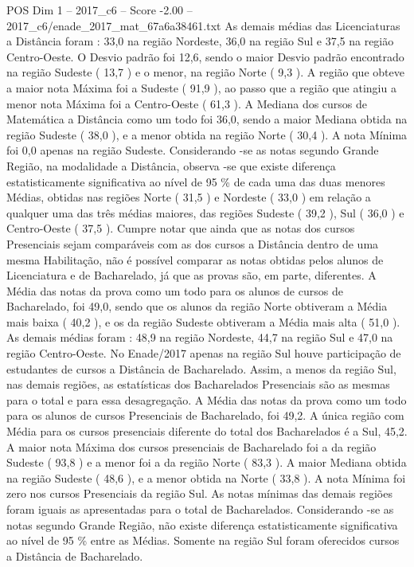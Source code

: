 \begin{textsample}{POS Dim 1 – 2017\_c6 – Score -2.00 – 2017\_c6/enade\_2017\_mat\_67a6a38461.txt}
As demais médias das Licenciaturas a Distância foram : 33,0 na região Nordeste, 36,0 na região Sul e 37,5 na região Centro-Oeste.
O Desvio padrão foi 12,6, sendo o maior Desvio padrão encontrado na região Sudeste ( 13,7 ) e o menor, na região Norte ( 9,3 ).
A região que obteve a maior nota Máxima foi a Sudeste ( 91,9 ), ao passo que a região que atingiu a menor nota Máxima foi a Centro-Oeste ( 61,3 ).
A Mediana dos cursos de Matemática a Distância como um todo foi 36,0, sendo a maior Mediana obtida na região Sudeste ( 38,0 ), e a menor obtida na região Norte ( 30,4 ).
A nota Mínima foi 0,0 apenas na região Sudeste.
Considerando -se as notas segundo Grande Região, na modalidade a Distância, observa -se que existe diferença estatisticamente significativa ao nível de 95 \% de cada uma das duas menores Médias, obtidas nas regiões Norte ( 31,5 ) e Nordeste ( 33,0 ) em relação a qualquer uma das três médias maiores, das regiões Sudeste ( 39,2 ), Sul ( 36,0 ) e Centro-Oeste ( 37,5 ).
Cumpre notar que ainda que as notas dos cursos Presenciais sejam comparáveis com as dos cursos a Distância dentro de uma mesma Habilitação, não é possível comparar as notas obtidas pelos alunos de Licenciatura e de Bacharelado, já que as provas são, em parte, diferentes.
A Média das notas da prova como um todo para os alunos de cursos de Bacharelado, foi 49,0, sendo que os alunos da região Norte obtiveram a Média mais baixa ( 40,2 ), e os da região Sudeste obtiveram a Média mais alta ( 51,0 ).
As demais médias foram : 48,9 na região Nordeste, 44,7 na região Sul e 47,0 na região Centro-Oeste.
No Enade/2017 apenas na região Sul houve participação de estudantes de cursos a Distância de Bacharelado.
Assim, a menos da região Sul, nas demais regiões, as estatísticas dos Bacharelados Presenciais são as mesmas para o total e para essa desagregação.
A Média das notas da prova como um todo para os alunos de cursos Presenciais de Bacharelado, foi 49,2.
A única região com Média para os cursos presenciais diferente do total dos Bacharelados é a Sul, 45,2.
A maior nota Máxima dos cursos presenciais de Bacharelado foi a da região Sudeste ( 93,8 ) e a menor foi a da região Norte ( 83,3 ).
A maior Mediana obtida na região Sudeste ( 48,6 ), e a menor obtida na Norte ( 33,8 ).
A nota Mínima foi zero nos cursos Presenciais da região Sul.
As notas mínimas das demais regiões foram iguais as apresentadas para o total de Bacharelados.
Considerando -se as notas segundo Grande Região, não existe diferença estatisticamente significativa ao nível de 95 \% entre as Médias.
Somente na região Sul foram oferecidos cursos a Distância de Bacharelado.

\end{textsample}
